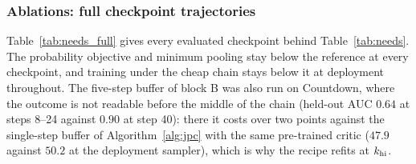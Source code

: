 \fi


\iffalse
\subsubsection{Ablations: full checkpoint trajectories}
\label{app:needs_full}
Table~\ref{tab:needs_full} gives every evaluated checkpoint behind Table~\ref{tab:needs}. The probability objective and minimum pooling stay below the reference at every checkpoint, and training under the cheap chain stays below it at deployment throughout. The five-step buffer of block B was also run on Countdown, where the outcome is not readable before the middle of the chain (held-out AUC $0.64$ at steps 8--24 against $0.90$ at step 40): there it costs over two points against the single-step buffer of Algorithm~\ref{alg:jpc} with the same pre-trained critic ($47.9$ against $50.2$ at the deployment sampler), which is why the recipe refits at $k_{\rm hi}$.

